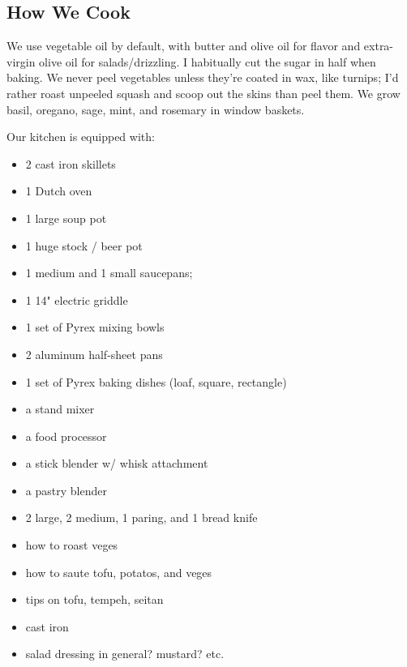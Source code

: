 
\subsection{How We Cook}
We use vegetable oil by default, with butter and olive oil for flavor and extra-virgin olive oil for salads/drizzling. I habitually cut the sugar in half when baking. We never peel vegetables unless they're coated in wax, like turnips; I'd rather roast unpeeled squash and scoop out the skins than peel them. We grow basil, oregano, sage, mint, and rosemary in window baskets.

Our kitchen is equipped with:
\begin{itemize}
 \item 2 cast iron skillets
 \item 1 Dutch oven
 \item 1 large soup pot
 \item 1 huge stock / beer pot
 \item 1 medium and 1 small saucepans;
 \item 1 14" electric griddle
 \item 1 set of Pyrex mixing bowls
 \item 2 aluminum half-sheet pans
 \item 1 set of Pyrex baking dishes (loaf, square, rectangle)
 \item a stand mixer
 \item a food processor
 \item a stick blender w/ whisk attachment
 \item a pastry blender
 \item 2 large, 2 medium, 1 paring, and 1 bread knife
\end{itemize}

\begin{itemize}
 \item how to roast veges
 \item how to saute tofu, potatos, and veges
 \item tips on tofu, tempeh, seitan
 \item cast iron
 \item salad dressing in general? mustard? etc.
\end{itemize}

